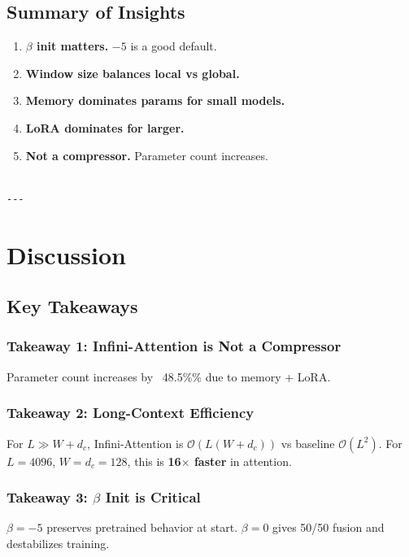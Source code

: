 \subsection{Summary of Insights}

\begin{enumerate}
\item \textbf{$\beta$ init matters.} $-5$ is a good default.
\item \textbf{Window size balances local vs global.}
\item \textbf{Memory dominates params for small models.}
\item \textbf{LoRA dominates for larger.}
\item \textbf{Not a compressor.} Parameter count increases.
\end{enumerate}
\begin{lstlisting}

---
\end{lstlisting}


\section{Discussion}

\subsection{Key Takeaways}

\subsubsection{Takeaway 1: Infini-Attention is Not a Compressor}

Parameter count increases by ~48.5\%\% due to memory + LoRA.

\subsubsection{Takeaway 2: Long-Context Efficiency}

For $L \gg W + d_c$, Infini-Attention is $\mathcal{O}(L(W + d_c))$ vs 
baseline $\mathcal{O}(L^2)$. For $L = 4096$, $W = d_c = 128$, this is 
\textbf{16$\times$ faster} in attention.

\subsubsection{Takeaway 3: $\beta$ Init is Critical}

$\beta = -5$ preserves pretrained behavior at start. $\beta = 0$ gives 
50/50 fusion and destabilizes training.

